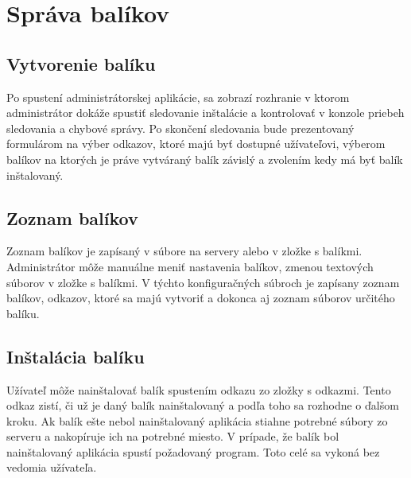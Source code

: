 \section{Správa balíkov}
\subsection{Vytvorenie balíku}
Po spustení administrátorskej aplikácie, sa zobrazí rozhranie v ktorom administrátor dokáže spustiť sledovanie inštalácie a kontrolovať v konzole priebeh sledovania a chybové správy. Po skončení sledovania bude prezentovaný formulárom na výber odkazov, ktoré majú byť dostupné užívateľovi, výberom balíkov na ktorých je práve vytváraný balík závislý a zvolením kedy má byť balík inštalovaný.

\subsection{Zoznam balíkov}
Zoznam balíkov je zapísaný v súbore na servery alebo v zložke s balíkmi. Administrátor môže manuálne meniť nastavenia balíkov, zmenou textových súborov v zložke s balíkmi. V týchto konfiguračných súbroch je zapísany zoznam balíkov, odkazov, ktoré sa majú vytvoriť a dokonca aj zoznam súborov určitého balíku.

\subsection{Inštalácia balíku}
Užívateľ môže nainštalovať balík spustením odkazu zo zložky s odkazmi. Tento odkaz zistí, či už je daný balík nainštalovaný a podľa toho sa rozhodne o ďalšom kroku. Ak balík ešte nebol nainštalovaný aplikácia stiahne potrebné súbory zo serveru a nakopíruje ich na potrebné miesto. V prípade, že balík bol nainštalovaný aplikácia spustí požadovaný program. Toto celé sa vykoná bez vedomia užívateľa.